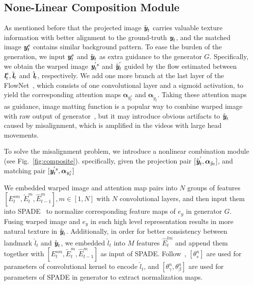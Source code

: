 \documentclass[runningheads]{llncs}
\def\mathbi#1{\textbf{\em #1}}
\begin{document}
\subsection{None-Linear Composition Module} 
\label{subsec:none-linear}
As mentioned before that the projected image $\tilde{\mathbi{y}}_t$ carries valuable texture information with better alignment to the ground-truth $ \mathbi{y}_t$, and the matched image $\mathbi{y}_t^s$ contains similar background pattern. To ease the burden of the generation, we input $\mathbi{y}_t^s$ and $\tilde{\mathbi{y}}_t$ as extra guidance to the generator $G$. Specifically, we obtain the warped image $\mathbi{y}_t^{'s}$ and $\tilde{\mathbi{y}}_t^{'} $ guided by the flow estimated between ${\mathbi{l}}^s_t, {\tilde{\mathbi{l}}}_t$ and ${\hat{\mathbi{l}}}_t$, respectively. We add one more branch at the last layer of the FlowNet~\cite{wang2018vid2vid}, which consists of one convolutional layer and a sigmoid activation, to yield the corresponding attention maps $\boldsymbol{\alpha}_{y_t^s}$ and $\boldsymbol{\alpha}_{\tilde{y}_t}$. Taking these attention maps as guidance, image matting function is a popular way to combine warped image with raw output of generator~\cite{wang2018fewshotvid2vid,wang2018vid2vid,chen2019hierarchical,pumarola2019ganimation}, but it may introduce obvious artifacts to $\hat{\mathbi{y}}_{t}$ caused by misalignment, which is amplified in the videos with large head movements. 

To solve the misalignment problem, we introduce a nonlinear combination module (see Fig.~\ref{fig:composite}). specifically, given the projection pair $[\tilde{\mathbi{y}}_t^{'},\boldsymbol{\alpha}_{\tilde{y}_t}]$, and matching pair $[\mathbi{y}_t^{'s}, \boldsymbol{\alpha}_{{y}_t^s}]$ 
 
 We embedded warped image and attention map pairs into $N$ groups of features $[E_t^{sm},\tilde{E}_t^m, \hat{E}_{t-1}^m], m\in [1, N]$ with $N$ convolutional layers, and then input them into SPADE~\cite{park2019semantic} to normalize corresponding feature maps of $e_y$ in generator $G$. Fusing warped image and $e_y$ in such high level representation results in more natural texture in $\hat{\mathbi{y}}_{t}$. Additionally, in order for better consistency between landmark $\hat{l}_t$ and $\hat{\mathbi{y}}_{t}$, we embedded $\hat{l}_t$ into $M$ features $\hat{E}_t^{lm}$ and append them together with $[E_t^{sm},\tilde{E}_t^m, \hat{E}_{t-1}^m]$ as input of SPADE. Follow~\cite{wang2018fewshotvid2vid}, $[\theta_s^n]$ are used for parameters of convolutional kernel to encode $\hat{l}_t$, and $[\theta_\gamma^n, \theta_\beta^n]$ are used for parameters of SPADE in generator to extract normalization maps.
\end{document}
